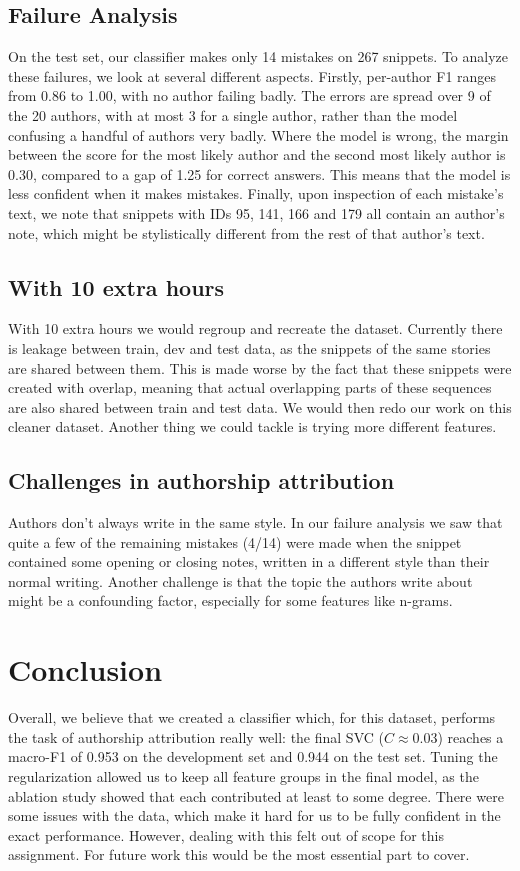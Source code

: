 \documentclass[11pt,twocolumn]{article}
\begin{document}
\subsection{Failure Analysis}
On the test set, our classifier makes only 14 mistakes on 267 snippets. To analyze these failures, we look at several different aspects. Firstly, per-author F1 ranges from 0.86 to 1.00, with no author failing badly. The errors are spread over 9 of the 20 authors, with at most 3 for a single author, rather than the model confusing a handful of authors very badly. Where the model is wrong, the margin between the score for the most likely author and the second most likely author is 0.30, compared to a gap of 1.25 for correct answers. This means that the model is less confident when it makes mistakes. Finally, upon inspection of each mistake's text, we note that snippets with IDs 95, 141, 166 and 179 all contain an author's note, which might be stylistically different from the rest of that author's text. 

\subsection{With 10 extra hours}
With 10 extra hours we would regroup and recreate the dataset. Currently there is leakage between train, dev and test data, as the snippets of the same stories are shared between them. This is made worse by the fact that these snippets were created with overlap, meaning that actual overlapping parts of these sequences are also shared between train and test data. We would then redo our work on this cleaner dataset. Another thing we could tackle is trying more different features.

\subsection{Challenges in authorship attribution}
Authors don't always write in the same style. In our failure analysis we saw that quite a few of the remaining mistakes (4/14) were made when the snippet contained some opening or closing notes, written in a different style than their normal writing. Another challenge is that the topic the authors write about might be a confounding factor, especially for some features like n-grams. 

\section{Conclusion}
Overall, we believe that we created a classifier which, for this dataset, performs the task of authorship attribution really well: the final SVC ($C \approx 0.03$) reaches a macro-F1 of 0.953 on the development set and 0.944 on the test set. Tuning the regularization allowed us to keep all feature groups in the final model, as the ablation study showed that each contributed at least to some degree. There were some issues with the data, which make it hard for us to be fully confident in the exact performance. However, dealing with this felt out of scope for this assignment. For future work this would be the most essential part to cover. 
\end{document}
